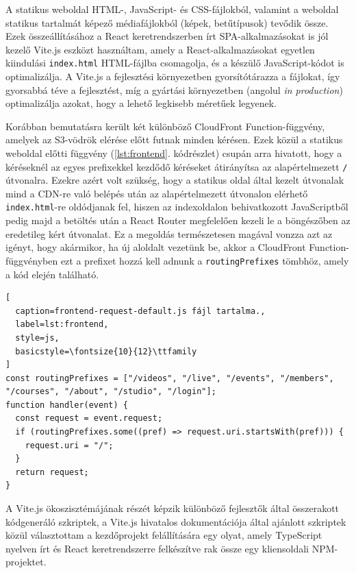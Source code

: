A statikus weboldal HTML-, JavaScript- és CSS-fájlokból, valamint a weboldal statikus tartalmát képező médiafájlokból (képek, betűtípusok) tevődik össze. Ezek összeállításához a React keretrendszerben írt SPA-alkalmazásokat is jól kezelő Vite.js eszközt használtam, amely a React-alkalmazásokat egyetlen kiindulási \verb|index.html| HTML-fájlba csomagolja, és a készülő JavaScript-kódot is optimalizálja. A Vite.js a fejlesztési környezetben gyorsítótárazza a fájlokat, így gyorsabbá téve a fejlesztést, míg a gyártási környezetben (angolul \emph{in production}) optimalizálja azokat, hogy a lehető legkisebb méretűek legyenek.

Korábban bemutatásra került két különböző CloudFront Function-függvény, amelyek az S3-vödrök elérése előtt futnak minden kérésen. Ezek közül a statikus weboldal előtti függvény (\ref{lst:frontend}. kódrészlet) csupán arra hivatott, hogy a kéréseknél az egyes prefixekkel kezdődő kéréseket átirányítsa az alapértelmezett \verb|/| útvonalra. Ezekre azért volt szükség, hogy a statikus oldal által kezelt útvonalak mind a CDN-re való belépés után az alapértelmezett útvonalon elérhető \verb|index.html|-re oldódjanak fel, hiszen az indexoldalon behivatkozott JavaScriptből pedig majd a betöltés után a React Router megfelelően kezeli le a böngészőben az eredetileg kért útvonalat. Ez a megoldás természetesen magával vonzza azt az igényt, hogy akármikor, ha új aloldalt vezetünk be, akkor a CloudFront Function-függvényben ezt a prefixet hozzá kell adnunk a \verb|routingPrefixes| tömbhöz, amely a kód elején található.

\begin{minipage}{0.92\textwidth}
  \begin{lstlisting}[
  caption=frontend-request-default.js fájl tartalma.,
  label=lst:frontend,
  style=js,
  basicstyle=\fontsize{10}{12}\ttfamily
]
const routingPrefixes = ["/videos", "/live", "/events", "/members", "/courses", "/about", "/studio", "/login"];
function handler(event) {
  const request = event.request;
  if (routingPrefixes.some((pref) => request.uri.startsWith(pref))) {
    request.uri = "/";
  }
  return request;
}
\end{lstlisting}
\end{minipage}

A Vite.js ökoszisztémájának részét képzik különböző fejlesztők által összerakott kódgeneráló szkriptek, a Vite.js hivatalos dokumentációja által ajánlott szkriptek közül választottam a kezdőprojekt felállítására egy olyat, amely TypeScript nyelven írt és React keretrendszerre felkészítve rak össze egy kliensoldali NPM-projektet.

